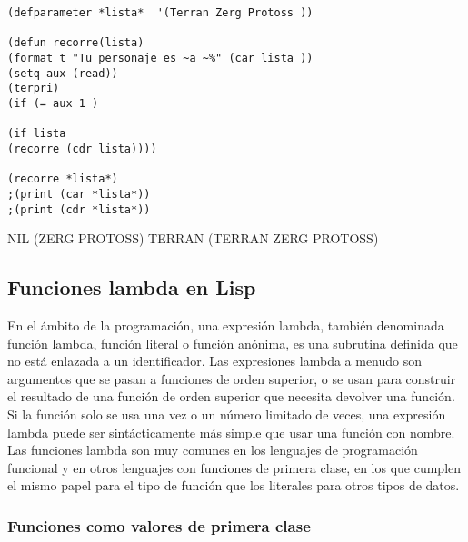 \documentclass[11pt]{article}
\begin{document}
\begin{verbatim}
(defparameter *lista*  '(Terran Zerg Protoss ))

(defun recorre(lista)
(format t "Tu personaje es ~a ~%" (car lista ))
(setq aux (read))
(terpri)
(if (= aux 1 )

(if lista
(recorre (cdr lista))))

(recorre *lista*)
;(print (car *lista*))
;(print (cdr *lista*))
\end{verbatim}
NIL
(ZERG PROTOSS)
TERRAN
(TERRAN ZERG PROTOSS)

\subsection*{Funciones lambda en Lisp}
\label{sec:org962f973}

En el ámbito de la programación, una expresión lambda, también
denominada función lambda, función literal o función anónima, es una
subrutina definida que no está enlazada a un identificador. Las
expresiones lambda a menudo son argumentos que se pasan a funciones de
orden superior, o se usan para construir el resultado de una función
de orden superior que necesita devolver una función.​ Si la función
solo se usa una vez o un número limitado de veces, una expresión
lambda puede ser sintácticamente más simple que usar una función con
nombre. Las funciones lambda son muy comunes en los lenguajes de
programación funcional y en otros lenguajes con funciones de primera
clase, en los que cumplen el mismo papel para el tipo de función que
los literales para otros tipos de datos.


\subsubsection*{Funciones como valores de primera clase}
\label{sec:org7ce077c}
\end{document}
